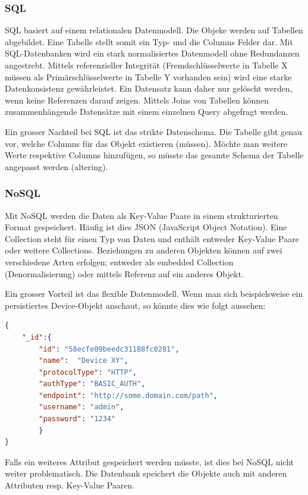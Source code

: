 \subsubsection{SQL}
SQL basiert auf einem relationalen Datenmodell. Die Objeke werden auf Tabellen abgebildet. Eine Tabelle stellt somit ein Typ- und die Columns Felder dar. Mit SQL-Datenbanken wird ein stark normalisiertes Datenmodell ohne Redundanzen angestrebt. Mittels referenzieller Integrität (Fremdschlüsselwerte in Tabelle X müssen als Primärschlüsselwerte in Tabelle Y vorhanden sein) wird eine starke Datenkonsistenz gewährleistet. Ein Datensatz kann daher nur gelöscht werden, wenn keine Referenzen darauf zeigen. Mittels Joins von Tabellen können zusammenhängende Datensätze mit einem einzelnen Query abgefragt werden.

Ein grosser Nachteil bei SQL ist das strikte Datenschema. Die Tabelle gibt genau vor, welche Columns für das Objekt existieren (müssen). Möchte man weitere Werte respektive Columns hinzufügen, so müsste das gesamte Schema der Tabelle angepasst werden (altering).

\subsubsection{NoSQL}
Mit NoSQL werden die Daten als Key-Value Paare in einem strukturierten Format gespeichert. Häufig ist dies JSON (JavaScript Object Notation). Eine Collection steht für einen Typ von Daten und enthält entweder Key-Value Paare oder weitere Collections. Beziehungen zu anderen Objekten können auf zwei verschiedene Arten erfolgen; entweder als embedded Collection (Denormalisierung) oder mittels Referenz auf ein anderes Objekt.

Ein grosser Vorteil ist das flexible Datenmodell. Wenn man sich beispielsweise ein persistiertes Device-Objekt anschaut, so könnte dies wie folgt aussehen:
\begin{lstlisting}[language=json]
{
    "_id":{
        "id": "58ecfe09beedc31188fc0281",
        "name":  "Device XY",
        "protocolType": "HTTP",
        "authType": "BASIC_AUTH",
        "endpoint": "http://some.domain.com/path",
        "username": "admin",
        "password": "1234"
        }    
}
\end{lstlisting}
Falls ein weiteres Attribut gespeichert werden müsste, ist dies bei NoSQL nicht weiter problematisch. Die Datenbank speichert die Objekte auch mit anderen Attributen resp. Key-Value Paaren.

